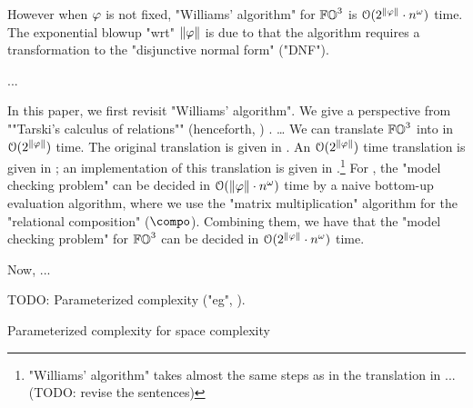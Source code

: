However when $\fml$ is not fixed, "Williams' algorithm" \cite{williamsFasterDecisionFirstorder2014} for $\mathbb{FO}^{3}$  is $\mathcal{O}(2^{\len{\fml}} \cdot n^{\omega})$ time.
The exponential blowup "wrt" $\len{\fml}$ is due to that the algorithm requires a transformation to the "disjunctive normal form" ("DNF").

...

In this paper, we first revisit "Williams' algorithm".
We give a perspective from ""Tarski's calculus of relations"" (henceforth, \reintro*{}) \cite{tarskiCalculusRelations1941}.
\dots
We can translate $\mathbb{FO}^{3}$  into   in $\mathcal{O}(2^{\len{\fml}})$ time.
The original translation is given in \cite{tarskiFormalizationSetTheory1987}.
An $\mathcal{O}(2^{\len{\fml}})$ time translation is given in \cite{nakamuraExpressivePowerSuccinctness2022}; an implementation of this translation is given in \cite{brogniTranslatingThreeVariableFirstOrder2025}.\footnote{"Williams' algorithm" takes almost the same steps as in the translation in \cite{nakamuraExpressivePowerSuccinctness2022}... (TODO: revise the sentences)}
For  , the "model checking problem" can be decided in $\mathcal{O}(\len{\fml} \cdot n^{\omega})$ time by a naive bottom-up evaluation algorithm,
where we use the "matrix multiplication" algorithm for the "relational composition" ($\compo$).
Combining them, we have that the "model checking problem" for $\mathbb{FO}^{3}$  can be decided in $\mathcal{O}(2^{\len{\fml}} \cdot n^{\omega})$ time.


Now, 
...


\begin{yoshiki}
    TODO: Parameterized complexity ("eg", \cite{flumParameterizedComplexityTheory2006,flumFixedParameterTractabilityDefinability2001,flumModelCheckingProblemsBasis2005, frickComplexityFirstorderMonadic2004}).

    Parameterized complexity for space complexity \cite{chenParameterizedSpaceComplexity2019}
\end{yoshiki}